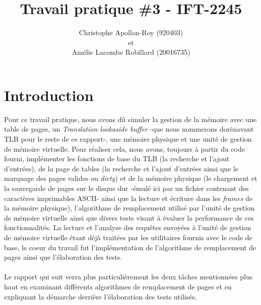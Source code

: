 \documentclass{article}
\title{Travail pratique \#3 - IFT-2245}
\author{Christophe Apollon-Roy (920403) \\et \\Amélie Lacombe Robillard (20016735)}
\begin{document}
\maketitle

\section{Introduction}
\setlength{\parindent}{20pt}
Pour ce travail pratique, nous avons dû simuler la gestion de la mémoire avec une table de pages, un \emph{Translation lookaside buffer} 
-que nous nommerons dorénavant TLB pour le reste de ce rapport-, une mémoire physique et une unité de gestion de mémoire virtuelle. Pour réaliser 
cela, nous avons, toujours à partir du code fourni, implémenter les fonctions de base du TLB (la recherche et l'ajout d'entrées), de la page de 
tables (la recherche et l'ajout d'entrées ainsi que le marquage des pages valides ou \emph{dirty}) et de la mémoire physique (le chargement et la 
sauvegarde de pages sur le disque dur -émulé ici par un fichier contenant des caractères imprimables ASCII- ainsi que la lecture et écriture dans 
les \emph{frames} de la mémoire physique), l'algorithme de remplacement utilisé par l'unité de gestion de mémoire virtuelle ainsi que divers 
tests visant à évaluer la performance de ces fonctionnalités. La lecture et l'analyse des requêtes envoyées à l'unité de gestion de mémoire 
virtuelle étant déjà traitées par les utilitaires fournis avec le code de base, le coeur du travail fut l'implémentation de l'algorithme de 
remplacement de pages ainsi que l'élaboration des tests.\\
\\
Le rapport qui suit verra plus particulièrement les deux tâches mentionnées plus haut en examinant différents algorithmes de remplacement de 
pages et en expliquant la démarche derrière l'élaboration des tests utilisés.\\
\\
\end{document}
